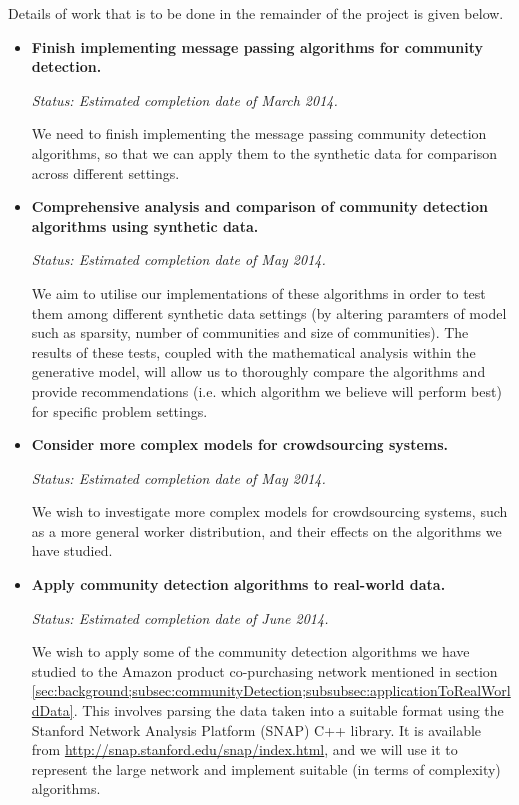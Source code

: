 \documentclass[12pt]{article}
\numberwithin{equation}{section}
\begin{document}
Details of work that is to be done in the remainder of the project is given below.
\begin{itemize}
	\item \textbf{Finish implementing message passing algorithms for community detection.}

	\textit{Status: Estimated completion date of March 2014.}	

	We need to finish implementing the message passing community detection algorithms, so that we can apply them to the synthetic data for comparison across different settings.

	\item \textbf{Comprehensive analysis and comparison of community detection algorithms using synthetic data.}

	\textit{Status: Estimated completion date of May 2014.}	

	We aim to utilise our implementations of these algorithms in order to test them among different synthetic data settings (by altering paramters of model such as sparsity, number of communities and size of communities). The results of these tests, coupled with the mathematical analysis within the generative model, will allow us to thoroughly compare the algorithms and provide recommendations (i.e. which algorithm we believe will perform best) for specific problem settings.

	\item \textbf{Consider more complex models for crowdsourcing systems.}

	\textit{Status: Estimated completion date of May 2014.}	

	We wish to investigate more complex models for crowdsourcing systems, such as a more general worker distribution, and their effects on the algorithms we have studied.

	\item \textbf{Apply community detection algorithms to real-world data.}

	\textit{Status: Estimated completion date of June 2014.}	

	We wish to apply some of the community detection algorithms we have studied to the Amazon product co-purchasing network mentioned in section \ref{sec:background;subsec:communityDetection;subsubsec:applicationToRealWorldData}. This involves parsing the data taken into a suitable format using the Stanford Network Analysis Platform (SNAP) C++ library. It is available from \url{http://snap.stanford.edu/snap/index.html}, and we will use it to represent the large network and implement suitable (in terms of complexity) algorithms.
\end{itemize}
\end{document}
